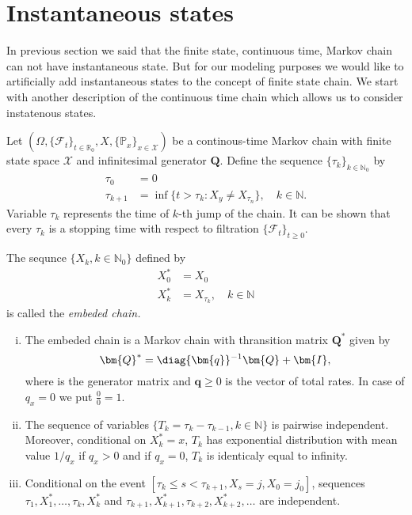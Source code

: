 \section{Instantaneous states}

In previous section we said that the finite state, continuous time, Markov chain can not have instantaneous state. But for our modeling purposes we would like to artificially add instantaneous states to the concept of finite state chain. We start with another description of the continuous time chain which allows us to consider instatenous states.

Let $(\Omega,\{\mathcal{F}_{t}\}_{t\in\mathbb{R}_0},X,\{\mathbb{P}_x\}_{x\in\mathcal{X}})$ be a continous-time Markov chain with finite state space $\mathcal{X}$ and infinitesimal generator $
\bm{Q}$. Define the sequence $\{\tau_k\}_{k\in\mathbb{N}_0}$ by 
\begin{align*}
\tau_0&=0\\
\tau_{k+1}&=\inf\{t>\tau_k: X_y\neq X_{\tau_n}\}, \quad k\in\mathbb{N}.
\end{align*}
Variable $\tau_k$ represents the time of $k$-th jump of the chain. It can be shown that every $\tau_k$ is a stopping time with respect to filtration $\{\mathcal{F}_{t}\}_{t\geq 0}$.
\begin{df}
The sequnce $\{X_k,k\in\mathbb{N}_0\}$ defined by
\begin{align*}
X^*_0&=X_0\\
X^*_k&=X_{\tau_k},\quad k\in\mathbb{N}
\end{align*}
is called the {\em embeded chain.}
\end{df}
\begin{thm}
\begin{enumerate}[(i)] 
\item The embeded chain is a Markov chain with thransition matrix $\bm{Q}^*$ given by
\begin{equation}
\label{TrMat} 
 \bm{Q}^*=\diag\{\bm{q}\}^{-1}\bm{Q}+\bm{I},
\end{equation}
where  is the generator matrix and $\bm{q}\geq 0$ is the vector of total rates. In case of $q_x=0$ we put $\tfrac{0}{0}=1$.
\item  The sequence of variables $\{T_k=\tau_k-\tau_{k-1}, k\in\mathbb{N}\}$ is pairwise independent. Moreover, conditional on $X^*_k=x$, $T_k$ has exponential distribution with mean value $1/q_x$ if $q_x>0$ and if $q_x=0$, $T_k$ is identicaly equal to infinity.
\item Conditional on the event $[\tau_k\leq s <\tau_{k+1},X_s=j,X_0=j_0]$, sequences $\tau_1,X^*_1,\dots,\tau_k,X^*_k$ and $\tau_{k+1},X^*_{k+1},\tau_{k+2},X^*_{k+2},\dots$ are independent.
\end{enumerate}
\end{thm}

